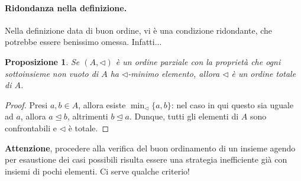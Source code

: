 \documentclass[fontsize = 11 pt, paper=A4, oneside, index=totoc, hyperref]{article}
\theoremstyle{definition}
\theoremstyle{plain}
\newtheorem{prp}{Proposizione}[section]
\begin{document}
\paragraph{Ridondanza nella definizione.} Nella definizione data di buon ordine, vi è una condizione ridondante, che potrebbe essere benissimo omessa. Infatti...
\begin{prp}
  Se \((A, \lhd)\) è un ordine parziale con la proprietà che ogni sottoinsieme non vuoto di \(A\) ha \(\lhd\)-minimo elemento, allora \(\lhd\) è un ordine totale di \(A\).
\end{prp}
\begin{proof}
  Presi \(a,b \in A\), allora esiste \(\min_\lhd \lbrace a,b \rbrace\): nel caso in qui questo sia uguale ad \(a\), allora \(a \unlhd b\), altrimenti \(b \unlhd a\). Dunque, tutti gli elementi di \(A\) sono confrontabili e \(\lhd\) è totale.
\end{proof}

{\bf Attenzione}, procedere alla verifica del buon ordinamento di un insieme agendo per esaustione dei casi possibili risulta essere una strategia inefficiente già con insiemi di pochi elementi. Ci serve qualche criterio!
\end{document}
